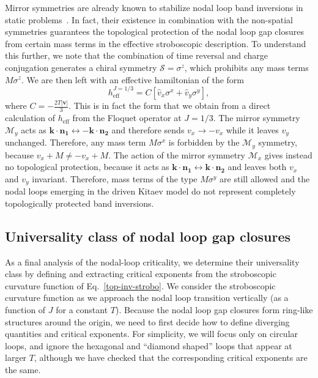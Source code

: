 \documentclass[aps,prb,twocolumn,superscriptaddress,groupedaddress]{revtex4}
\begin{document}
Mirror symmetries are already known to stabilize nodal loop band inversions in static problems~\cite{Andreas-lecture-notes}.
In fact, their existence in combination with the non-spatial symmetries guarantees the topological protection of the nodal loop gap closures from certain mass terms in the effective stroboscopic description.
To understand this further, we note that the combination of time reversal and charge conjugation generates a chiral symmetry $\mathcal{S} = \sigma^z$, which prohibits any mass terms $M\sigma^z$.
We are then left with an effective hamiltonian of the form
%
\begin{equation}
h_{\text{eff}}^{J=1/3} = C[ \hat{v}_x \sigma^x + \hat{v}_y \sigma^y],
\end{equation}
%
where $C = -\frac{2T |\mathbf{v}|}{3}$.
This is in fact the form that we obtain from a direct calculation of $h_{\text{eff}}$ from the Floquet operator at $J=1/3$.
The mirror symmetry $\mathcal{M}_y$ acts as $\mathbf{k} \cdot \mathbf{n_1} \leftrightarrow -\mathbf{k} \cdot \mathbf{n_2}$ and therefore sends $v_x \to - v_x$ while it leaves $v_y$ unchanged. 
Therefore, any mass term $M \sigma^x$ is forbidden by the $\mathcal{M}_y$ symmetry, because $v_x + M \neq -v_x + M$.
The action of the mirror symmetry $\mathcal{M}_x$ gives instead no topological protection, because it acts as  $\mathbf{k} \cdot \mathbf{n_1} \leftrightarrow \mathbf{k} \cdot \mathbf{n_2}$  and leaves both $v_x$ and $v_y$ invariant.
Therefore, mass terms of the type $M \sigma^y$ are still allowed and the nodal loops emerging in the driven Kitaev model do not represent completely topologically protected band inversions.



\subsection{Universality class of nodal loop gap closures}

As a final analysis of the nodal-loop criticality, we determine their universality class by defining and extracting critical exponents from the stroboscopic curvature function of Eq.~\eqref{top-inv-strobo}.
We consider the stroboscopic curvature function as we approach the nodal loop transition vertically (as a function of $J$ for a constant $T$).
Because the nodal loop gap closures form ring-like structures around the origin, we need to first decide how to define diverging quantities and critical exponents.
For simplicity, we will focus only on circular loops, and ignore the hexagonal and ``diamond shaped'' loops that appear at larger $T$, although we have checked that the corresponding critical exponents are the same.
\end{document}
